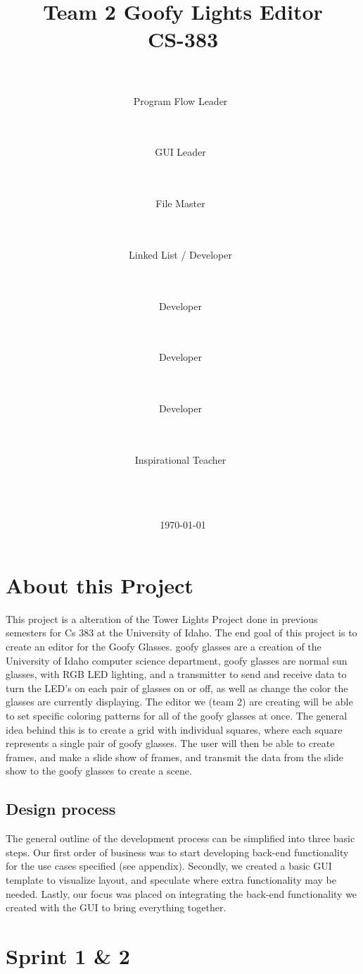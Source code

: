 \documentclass[11pt]{article} %
\title{
	{\Huge Team 2 Goofy Lights Editor}
	\\
	{\Large CS-383}}
\author{
	\\
	\makebox[.3\linewidth]{Nick Krenowicz}\\Program Flow Leader\ \and
	\\
	\makebox[.3\linewidth]{Paul Martin}\\GUI Leader\ \and
	\\
	\makebox[.3\linewidth]{Tim Sonnen}\\File Master\ \and
	\\
	\makebox[.3\linewidth]{Kevin Dorscher}\\Linked List / Developer\ \and
	\\
	\makebox[.3\linewidth]{Joe Carter}\\Developer\ \and
	\\
	\makebox[.3\linewidth]{Lise Welch}\\Developer\ \and
	\\
	\makebox[.3\linewidth]{Emma Bateman}\\Developer\ \and
	\\
	\makebox[.3\linewidth]{Bruce Bolden}\\Inspirational Teacher\ %
	\\
	\\
	\\
	\\}
\date{\today} %
\begin{document}
\lstset{language=C++}
\maketitle
\pagebreak

\tableofcontents
\newpage %


\section{About this Project}
This project is a alteration of the Tower Lights Project done in previous semesters for Cs 383 at the University of Idaho. The end goal of this project is to create an editor for the Goofy Glasses. goofy glasses are a creation of the University of Idaho computer science department, goofy glasses are normal sun glasses, with RGB LED lighting, and a transmitter to send and receive data to turn the LED's on each pair of glasses on or off, as well as change the color the glasses are currently displaying. The editor we (team 2) are creating will be able to set specific coloring patterns for all of the goofy glasses at once. The general idea behind this is to create a grid with individual squares, where each square represents a single pair of goofy glasses. The user will then be able to create frames, and make a slide show of frames, and transmit the data from the slide show to the goofy glasses to create a scene. 

\subsection{Design process}
The general outline of the development process can be simplified into three basic steps. Our first order of business was to start developing back-end functionality for the use cases specified (see appendix). Secondly, we created a basic GUI template to visualize layout, and speculate where extra functionality may be needed. Lastly, our focus was placed on integrating the back-end functionality we created with the GUI to bring everything together.

\section{Sprint 1 \& 2}
\end{document}
